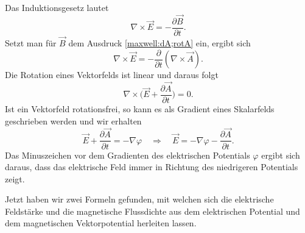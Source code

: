 Das Induktionsgesetz lautet
\begin{equation*}
	\nabla \times \vec{E} = - \frac{\partial \vec{B}}{\partial t}.
\end{equation*}
Setzt man für $\vec{B}$ dem Ausdruck \eqref{maxwell:dA;rotA} ein, ergibt sich
\begin{equation*}
	\nabla \times \vec{E} = - \frac{\partial}{\partial t}(\nabla \times \vec{A}).
\end{equation*}
Die Rotation eines Vektorfelds ist linear und daraus folgt
\begin{equation*}
	\nabla \times \biggl( \vec{E} + \frac{\partial \vec{A}}{\partial t}\biggr) = 0.
\end{equation*}
Ist ein Vektorfeld rotationsfrei, so kann es als Gradient eines Skalarfelds geschrieben werden und wir erhalten
\begin{equation}
	\label{maxwell:dA:defE}
	\vec{E} + \frac{\partial \vec{A}}{\partial t} = -\nabla \varphi \quad \Rightarrow \quad \vec{E} = -\nabla \varphi -\frac{\partial \vec{A}}{\partial t}.
\end{equation}
Das Minuszeichen vor dem Gradienten des elektrischen Potentials $\varphi$ ergibt sich daraus, dass das elektrische Feld immer in Richtung des niedrigeren Potentials zeigt.

Jetzt haben wir zwei Formeln gefunden, mit welchen sich die elektrische Feldstärke und die magnetische Flussdichte aus dem elektrischen Potential und dem magnetischen Vektorpotential herleiten lassen.
